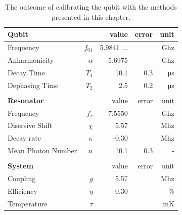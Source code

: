 \begin{table}[h]
\centering
\caption{The outcome of calibrating the qubit with the methods presented in this chapter.}
\begin{tabular}{lr|rrr}
\hline
\textbf{Qubit}                &          & value & error & unit \\ \hline
Frequency                     & $f_{01}$ &  5.9841 ...   &       & Ghz  \\
Anharmonicity                 & $\alpha$ &  5.6975       &       & Ghz  \\
Decay Time                    & $T_1$    &  10.1         &  0.3  & µs   \\
Dephasing Time                & $T_2$    &  2.5          &  0.2  & µs   \\ 
& & & & \\ \hline 

\textbf{Resonator}                &        & value      & error  & unit \\ \hline
Frequency                     & $f_{r}$    &  7.5550    &        & Ghz  \\
Disersive Shift               & $\chi$     &  5.57      &        & Mhz \\
Decay rate                    & $\kappa$   &  -0.30     &        & Mhz  \\
Mean Photon Number            & $\Bar{n}$  &  10.1      &  0.3   &  -  \\ 
& & & & \\ \hline 

\textbf{System}                &          & value & error & unit \\ \hline
Coupling                       & $g$      &  5.57         &         & Mhz  \\
Efficiency                     & $\eta$   &  -0.30        &     & \% \\
Temperature & $\tau$ & &  & mK 
\end{tabular}
\end{table}